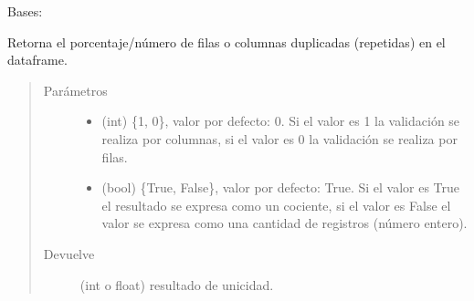 \documentclass[letterpaper,10pt,openany,spanish]{sphinxmanual}
\begin{document}
\begin{fulllineitems}
\label{\detokenize{calidad_datos:calidad_datos.CalidadDatos}}
Bases: 

\begin{fulllineitems}
\label{\detokenize{calidad_datos:calidad_datos.CalidadDatos.CantidadDuplicados}}
Retorna el porcentaje/número de             filas o columnas duplicadas (repetidas) en el dataframe.
\begin{quote}\begin{description}
\item[{Parámetros}] \leavevmode\begin{itemize}
\item {} 
 \textendash{} (int) \{1, 0\}, valor por defecto: 0. Si el valor             es 1 la validación se realiza por columnas, si el valor es                 0 la validación se realiza por filas.

\item {} 
 \textendash{} (bool) \{True, False\}, valor por defecto: True. Si el             valor es True el resultado se expresa como un cociente, si el                 valor es False el valor se expresa como una cantidad de                     registros (número entero).

\end{itemize}

\item[{Devuelve}] \leavevmode
(int o float) resultado de unicidad.

\end{description}\end{quote}


\end{fulllineitems}
\end{fulllineitems}
\end{document}

